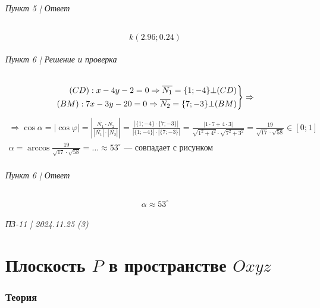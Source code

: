 \documentclass{article}
\newenvironment{rcases}
    {\left.\begin{aligned}}
    {\end{aligned}\right\rbrace}
\begin{document}
\paragraph{Пункт 5 | Ответ}
\[
    k(2.96; 0.24)
\]

\paragraph{Пункт 6 | Решение и проверка}
\begin{align*}
    \begin{rcases}
        (CD): x - 4y - 2 = 0   \Rightarrow \overline{N_1} = \{1; -4\} \bot (CD) \\
        (BM): 7x - 3y - 20 = 0 \Rightarrow \overline{N_2} = \{7; -3\} \bot (BM)
    \end{rcases} \Rightarrow
\end{align*}
\begin{gather*}
    \Rightarrow \cos \alpha = |\cos \varphi| = \left| \frac{\overline{N_1} \cdot \overline{N_2}}{|\overline{N_1}| \cdot |\overline{N_2}|} \right| =
    \frac{| \{1; -4\} \cdot \{7; -3\} |}{| \{1; -4\} | \cdot | \{7; -3\} | } =
    \frac{|1 \cdot 7 + 4 \cdot 3|}{\sqrt{1^2 + 4^2} \cdot \sqrt{7^2 + 3^2}} =
    \frac{19}{\sqrt{17} \cdot \sqrt{58}} \in [0; 1] \\
    \alpha = \arccos \frac{19}{\sqrt{17} \cdot \sqrt{58}} = \dots \approx 53^{\circ} \text{ --- совпадает с рисунком}
\end{gather*}

\paragraph{Пункт 6 | Ответ}
\[
    \alpha \approx 53^{\circ}
\]




\newpage
\paragraph{ПЗ-11 | 2024.11.25 (3)}
\part{Плоскость $P$ в пространстве $Oxyz$}

\section{Теория}
\end{document}
